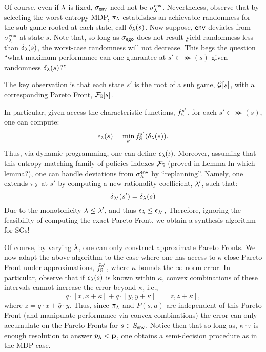 Of course, even if $\lambda$ is fixed, ${\sigma_{\mathsf{env}}}$ need not be
$\sigma^{\mathsf{env}}_\lambda$. Nevertheless, observe that by selecting the worst
entropy MDP, $\pi_\lambda$ establishes an achievable randomness for the
sub-game rooted at each state, call $\delta_\lambda(s)$. Now suppose,
$\mathsf{env}$ deviates from $\sigma_\lambda^{\mathsf{env}}$ at state $s$. Note that, so
long as ${\sigma_{\mathsf{ego}}}$ does not result yield randomness less than
$\delta_\lambda(s)$, the worst-case randomness will not decrease.
This begs the question ``what maximum performance can one guarantee at $s' \in
\Succ(s)$ given randomness $\delta_\lambda(s)$?''
\begin{mdframed}
  The key observation is that each state $s'$ is the root of a sub
  game, $\mathcal{G}[s]$, with a corresponding Pareto Front,
  $\mathcal{F}_{\mathbb{S}}[s]$.
\end{mdframed}
In particular, given access the characteristic functions,
$f_{\mathbb{S}}^{s'}$, for each $s' \in \Succ(s)$, one can compute:
\begin{equation}\label{eq:performance_lookup}
  \epsilon_\rat(s) = \min_{s'} f_\solutions^{s'}(\delta_\rat(s)).
\end{equation}
Thus, via dynamic programming, one can define $\epsilon_\lambda(\iota)$.
Moreover, assuming that this entropy matching family of policies
indexes $\mathcal{F}_{\mathbb{S}}$ (proved in Lemma {\color{red}In which lemma?}), one can handle
deviations from $\sigma^{\mathsf{env}}_\lambda$ by ``replanning''. Namely, one
extends $\pi_\lambda$ at $s'$ by computing a new rationality coefficient,
$\lambda'$, such that:
\begin{equation}
  \delta_{\lambda'}(s') = \delta_{\lambda}(s)
\end{equation}
Due to the monotonicity $\lambda \leq \lambda'$, and thus $\epsilon_\lambda \leq \epsilon_{\lambda'}$, 
Therefore, ignoring the feasibility of computing the exact Pareto
Front, we obtain a synthesis algorithm for SGs!

Of course, by varying $\lambda$, one can only construct approximate
Pareto Fronts. We now
adapt the above algorithm to the case where one has access to
$\kappa$-close Pareto Front under-approximations,
$\hat{f}_{\mathbb{S}}^{s'}$, where $\kappa$ bounds the $\infty$-norm
error. In particular, observe that if $\epsilon_\lambda(s)$ is known
within $\kappa$, convex combinations of these intervals cannot
increase the error beyond $\kappa$, i.e.,
\begin{equation}
  q\cdot[x, x + \kappa] + \bar{q}\cdot[y, y + \kappa] = [z, z + \kappa],
\end{equation}
where $z = q\cdot x + \bar{q}\cdot y$. Thus, since $\pi_\lambda$ and
$P(s, a)$ are independent of this Pareto Front (and manipulate
performance via convex combinations) the error can only accumulate on
the Pareto Fronts for $s \in S_{\mathsf{env}}$. Notice then that so long as,
$\kappa\cdot\tau$ is enough resolution to answer $p_\lambda <
\mathbf{p}$, one obtains a semi-decision procedure as in the MDP
case.

